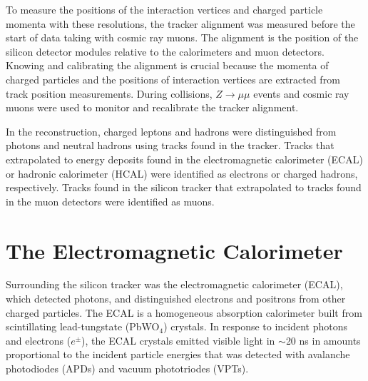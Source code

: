 To measure the positions of the interaction vertices and charged particle momenta with these resolutions, the tracker alignment was 
measured before the start of data taking with cosmic ray muons.  The alignment is the position of the silicon detector modules relative 
to the calorimeters and muon detectors.  Knowing and calibrating the alignment is crucial because the momenta of charged particles 
and the positions of interaction vertices are extracted from track position measurements.  During collisions, $Z \rightarrow \mu\mu$ 
events and cosmic ray muons were used to monitor and recalibrate the tracker alignment.

In the reconstruction, charged leptons and hadrons were distinguished from photons and neutral hadrons using tracks found in the 
tracker.  Tracks that extrapolated to energy deposits found in the electromagnetic calorimeter (ECAL) or hadronic calorimeter (HCAL) 
were identified as electrons or charged hadrons, respectively.  Tracks found in the silicon tracker that extrapolated to tracks found 
in the muon detectors were identified as muons.


\section{The Electromagnetic Calorimeter}
\label{sec:ecalDescription}
Surrounding the silicon tracker was the electromagnetic calorimeter (ECAL), which detected photons, and distinguished electrons and 
positrons from other charged particles.  The ECAL is a homogeneous absorption calorimeter built from scintillating lead-tungstate 
(PbWO$_{4}$) crystals.  In response to incident photons and electrons ($e^{\pm}$), the ECAL crystals emitted visible light in $\sim$20 
ns in amounts proportional to the incident particle energies that was detected with avalanche photodiodes (APDs) and vacuum phototriodes 
(VPTs).

